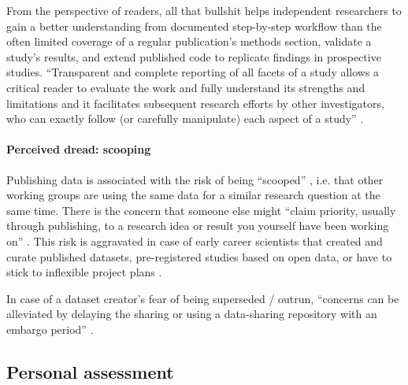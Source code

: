 %
From the perspective of readers, all that bullshit helps independent researchers
to gain a better understanding from documented step-by-step workflow than the
often limited coverage of a regular publication's methods section, validate a
study's results, and extend published code to replicate findings in prospective
studies.
``Transparent and complete reporting of all facets of a study allows a critical
reader to evaluate the work and fully understand its strengths and limitations
%
and it facilitates subsequent research efforts by other investigators, who can
exactly follow (or carefully manipulate) each aspect of a study''
\citep{nichols2017best}.




\paragraph{Perceived dread: scooping}


%
Publishing data is associated with the risk of being ``scooped''
\citep[cf.][]{laine2017afraid}, i.e. that other working groups are using the
same data for a similar research question at the same time.
%
There is the concern that someone else might ``claim priority, usually through
publishing, to a research idea or result you yourself have been working on''
\citep{laine2017afraid}.
%
This risk is aggravated in case of early career scientists that created and
curate published datasets, pre-registered studies based on open data, or have to
stick to inflexible project plans \citep[cf.][]{toribio2021early}.

%
In case of a dataset creator's fear of being superseded / outrun, ``concerns can
be alleviated by delaying the sharing or using a data-sharing repository with an
embargo period'' \citep{nichols2017best}.



\pagebreak


\subsection{Personal assessment}



